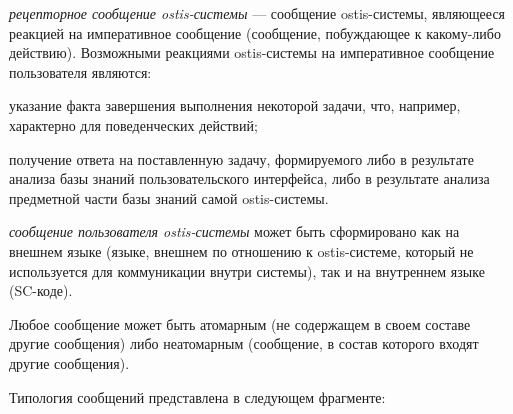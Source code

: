 \textit{рецепторное сообщение ostis-системы} --- сообщение ostis-системы, являющееся реакцией на императивное сообщение (сообщение, побуждающее к какому-либо действию). Возможными реакциями ostis-системы на императивное сообщение пользователя являются:
\begin{textitemize}
	\item указание факта завершения выполнения некоторой задачи, что, например, характерно для поведенческих действий;
	\item получение ответа на поставленную задачу, формируемого либо в результате анализа базы знаний пользовательского интерфейса, либо в результате анализа предметной части базы знаний самой ostis-системы.
\end{textitemize}

\textit{сообщение пользователя ostis-системы} может быть сформировано как на внешнем языке (языке, внешнем по отношению к ostis-системе, который не используется для коммуникации внутри системы), так и на внутреннем языке (SC-коде).

Любое сообщение может быть атомарным (не содержащем в своем составе другие сообщения) либо неатомарным (сообщение, в состав которого входят другие сообщения).

Типология сообщений представлена в следующем фрагменте:

